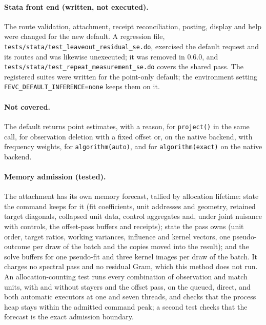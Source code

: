 \documentclass[11pt]{article}
\begin{document}
\begin{sloppypar}
\paragraph{Stata front end (written, not executed).} The route validation,
attachment, receipt reconciliation, posting, display and help were changed
for the new default. A regression file,
\texttt{tests/stata/test\_leaveout\_residual\_se.do}, exercised the default
request and its routes and was likewise unexecuted; it was removed in
0.6.0, and \texttt{tests/stata/test\_repeat\_measurement\_se.do} covers the
shared pass. The registered suites
were written for the point-only default; the environment setting
\texttt{FEVC\_DEFAULT\_INFERENCE=none} keeps them on it.

\paragraph{Not covered.} The default returns point estimates, with a reason,
for \texttt{project()} in the same call, for observation deletion with a
fixed offset or, on the native backend, with frequency weights, for
\texttt{algorithm(auto)}, and for \texttt{algorithm(exact)} on the native
backend.

\paragraph{Memory admission (tested).} The attachment has its own memory
forecast, tallied by allocation lifetime: state the command keeps for it
(fit coefficients, unit addresses and geometry, retained target diagonals,
collapsed unit data, control aggregates and, under joint nuisance with
controls, the offset-pass buffers and receipts); state the pass owns (unit
order, target ratios, working variances, influence and kernel vectors, one
pseudo-outcome per draw of the batch and the copies moved into the result);
and the solve buffers for one pseudo-fit and three kernel images per draw of
the batch. It charges no spectral pass and no residual Gram, which this method
does not run. An allocation-counting test runs every combination of
observation and match units, with and without stayers and the offset pass, on
the queued, direct, and both automatic executors at one and seven threads, and
checks that the process heap stays within the admitted command peak; a second
test checks that the forecast is the exact admission boundary.


\end{sloppypar}
\end{document}
